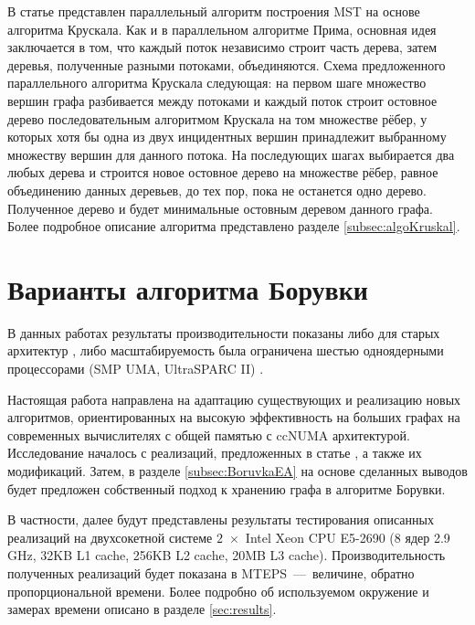 \documentclass[a4paper,12pt]{extarticle}
\let\stdsection\section
\renewcommand\section{
    \newpage
    \stdsection
}
\begin{document}
В статье \cite{kruskal-parallel} представлен параллельный алгоритм построения MST на основе алгоритма Крускала.
Как и в параллельном алгоритме Прима, основная идея заключается в том, что каждый поток независимо строит часть дерева, затем деревья, полученные разными потоками, объединяются.
Схема предложенного параллельного алгоритма Крускала следующая: на первом шаге множество вершин графа разбивается между потоками и каждый поток строит остовное дерево последовательным алгоритмом Крускала на том множестве рёбер, у которых хотя бы одна из двух инцидентных  вершин принадлежит выбранному множеству вершин для данного потока. На последующих шагах выбирается два любых дерева и строится новое остовное дерево на множестве рёбер, равное объединению данных деревьев, до тех пор, пока не останется одно дерево. Полученное дерево и будет минимальные остовным деревом данного графа. Более подробное описание алгоритма представлено разделе \ref{subsec:algoKruskal}.

\section{Варианты алгоритма Борувки}
\label{sec:boruvkaIntro}

В данных работах \cite{dense-mst,boruvka-prima,boruvka-cm5} результаты производительности показаны либо для старых архитектур \cite{dense-mst,boruvka-cm5}, либо масштабируемость была ограничена шестью одноядерными процессорами (SMP  UMA, UltraSPARC II) \cite{boruvka-prima}.

Настоящая работа направлена на адаптацию существующих и реализацию новых алгоритмов, ориентированных на высокую эффективность на больших графах на современных вычислителях с общей памятью с ccNUMA архитектурой.
Исследование началось с реализаций, предложенных в статье \cite{boruvka-prima}, а также их модификаций. Затем, в разделе \ref{subsec:BoruvkaEA} на основе сделанных выводов будет предложен собственный подход к хранению графа в алгоритме Борувки.

В частности, далее будут представлены результаты тестирования описанных реализаций на двухсокетной системе $2$~$\times$~Intel Xeon CPU E5-2690 (8 ядер 2.9 GHz, 32KB L1 cache, 256KB L2 cache, 20MB L3 cache). Производительность полученных реализаций будет показана в MTEPS~---~величине, обратно пропорциональной времени. Более подробно об используемом окружение и замерах времени описано в разделе \ref{sec:results}.
\end{document}
